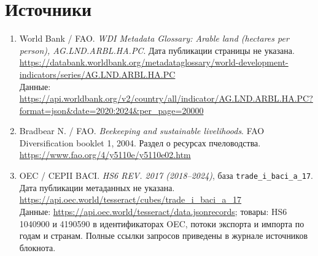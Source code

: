 \documentclass[11pt,a4paper]{article}
\begin{document}
\section*{Источники}
\begin{enumerate}
\item World Bank / FAO. \textit{WDI Metadata Glossary: Arable land (hectares per person), AG.LND.ARBL.HA.PC}. Дата публикации страницы не указана.\\
\url{https://databank.worldbank.org/metadataglossary/world-development-indicators/series/AG.LND.ARBL.HA.PC}\\
Данные: \url{https://api.worldbank.org/v2/country/all/indicator/AG.LND.ARBL.HA.PC?format=json&date=2020:2024&per_page=20000}
\item Bradbear N. / FAO. \textit{Beekeeping and sustainable livelihoods}. FAO Diversification booklet 1, 2004. Раздел о ресурсах пчеловодства.\\
\url{https://www.fao.org/4/y5110e/y5110e02.htm}
\item OEC / CEPII BACI. \textit{HS6 REV. 2017 (2018--2024)}, база \texttt{trade\_i\_baci\_a\_17}. Дата публикации метаданных не указана.\\
\url{https://api.oec.world/tesseract/cubes/trade_i_baci_a_17}\\
Данные: \url{https://api.oec.world/tesseract/data.jsonrecords}; товары: HS6 1040900 и 4190590 в идентификаторах OEC, потоки экспорта и импорта по годам и странам. Полные ссылки запросов приведены в журнале источников блокнота.
\end{enumerate}
\end{document}
